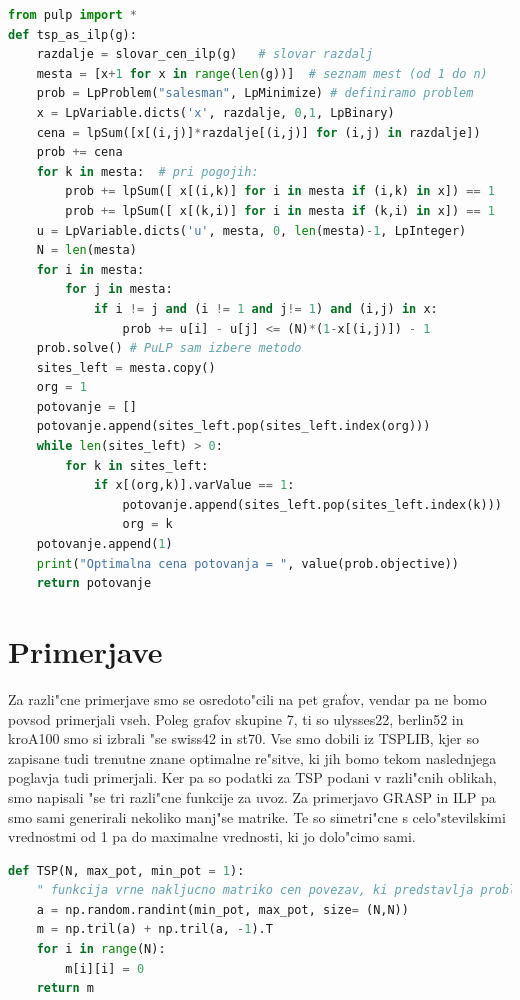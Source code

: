 \documentclass[12pt,a4paper]{amsart}
\theoremstyle{definition} %
\theoremstyle{plain} %
\begin{document}
\begin{lstlisting}[language=Python]
from pulp import *
def tsp_as_ilp(g):
    razdalje = slovar_cen_ilp(g)   # slovar razdalj 
    mesta = [x+1 for x in range(len(g))]  # seznam mest (od 1 do n)
    prob = LpProblem("salesman", LpMinimize) # definiramo problem
    x = LpVariable.dicts('x', razdalje, 0,1, LpBinary) 
    cena = lpSum([x[(i,j)]*razdalje[(i,j)] for (i,j) in razdalje]) 
    prob += cena
    for k in mesta:  # pri pogojih:
        prob += lpSum([ x[(i,k)] for i in mesta if (i,k) in x]) == 1  
        prob += lpSum([ x[(k,i)] for i in mesta if (k,i) in x]) == 1  
    u = LpVariable.dicts('u', mesta, 0, len(mesta)-1, LpInteger) 
    N = len(mesta)
    for i in mesta:  
        for j in mesta:
            if i != j and (i != 1 and j!= 1) and (i,j) in x:
                prob += u[i] - u[j] <= (N)*(1-x[(i,j)]) - 1
    prob.solve() # PuLP sam izbere metodo
    sites_left = mesta.copy()
    org = 1 
    potovanje = []
    potovanje.append(sites_left.pop(sites_left.index(org))) 
    while len(sites_left) > 0:
        for k in sites_left:
            if x[(org,k)].varValue == 1:
                potovanje.append(sites_left.pop(sites_left.index(k)))
                org = k             
    potovanje.append(1)    
    print("Optimalna cena potovanja = ", value(prob.objective))
    return potovanje
\end{lstlisting}



\section{Primerjave}
Za razli"cne primerjave smo se osredoto"cili na pet grafov, vendar pa ne bomo povsod primerjali vseh. Poleg grafov skupine 7, ti so ulysses22, berlin52 in kroA100 smo si izbrali "se swiss42 in st70. Vse smo dobili iz TSPLIB, kjer so zapisane tudi trenutne znane optimalne re"sitve, ki jih bomo tekom naslednjega poglavja tudi primerjali. Ker pa so podatki za TSP podani v razli"cnih oblikah, smo napisali "se tri razli"cne funkcije za uvoz. Za primerjavo GRASP in ILP pa smo sami generirali nekoliko manj"se matrike. Te so simetri"cne s celo"stevilskimi vrednostmi od 1 pa do maximalne vrednosti, ki jo dolo"cimo sami. 

\begin{lstlisting}[language=Python]
def TSP(N, max_pot, min_pot = 1):
    " funkcija vrne nakljucno matriko cen povezav, ki predstavlja problem potujocega trgovca"
    a = np.random.randint(min_pot, max_pot, size= (N,N))
    m = np.tril(a) + np.tril(a, -1).T
    for i in range(N):
        m[i][i] = 0
    return m
\end{lstlisting}
\end{document}
